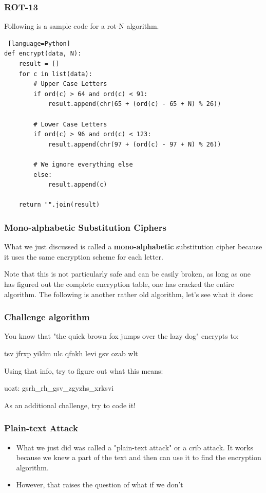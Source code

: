 \documentclass{beamer}
\begin{document}
\begin{frame}[fragile]
\frametitle{ROT-13}

Following is a sample code for a rot-N algorithm.

\begin{lstlisting} [language=Python]
def encrypt(data, N):
    result = []
    for c in list(data):
        # Upper Case Letters
        if ord(c) > 64 and ord(c) < 91:
            result.append(chr(65 + (ord(c) - 65 + N) % 26))

        # Lower Case Letters
        if ord(c) > 96 and ord(c) < 123:
            result.append(chr(97 + (ord(c) - 97 + N) % 26))

        # We ignore everything else
        else:
            result.append(c)

    return "".join(result)
\end{lstlisting}

\end{frame}

\begin{frame}
\frametitle{Mono-alphabetic Substitution Ciphers}
What we just discussed is called a \textbf{mono-alphabetic} substitution cipher
because it uses the same encryption scheme for each letter.

Note that this is not particularly safe and can be easily broken, as long as one
has figured out the complete encryption table, one has cracked the entire
algorithm. The following is another rather old algorithm, let's see what it
does:
\end{frame}

\begin{frame}
    \frametitle{Challenge algorithm}

    You know that "the quick brown fox jumps over the lazy dog" encrypts to:

    \begin{center}
     tsv jfrxp yildm ulc qfnkh levi gsv ozab wlt 
    \end{center}

    Using that info, try to figure out what this means:

    uozt: gsrh\_rh\_gsv\_zgyzhs\_xrksvi 

    As an additional challenge, try to code it!
\end{frame}

\begin{frame}
    \frametitle{Plain-text Attack}
    \begin{itemize}
        \item What we just did was called a "plain-text attack" or a crib
            attack. It works because we knew a part of the text and then
            can use it to find the encryption algorithm.
        \item However, that raises the question of what if we don't
    \end{itemize}
\end{frame}
\end{document}

